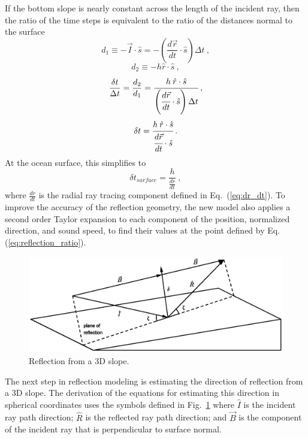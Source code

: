 \documentclass{ws-jca}
\newcommand{\threeD}{3\nobreakdash\textendash D }	%
\begin{document}
If the bottom slope is nearly constant across the length of the incident
ray, then the ratio of the time steps is equivalent to the ratio of the
distances normal to the surface
\begin{equation}
	d_1 \equiv - \vec{I} \cdot \hat{s} 
		= - \left( \frac{d\vec{r}}{dt} \cdot \hat{s} \right) \Delta t \:,
	\label{eq:reflection_d1}
\end{equation}
\begin{equation}
	d_2 \equiv - h \hat{r} \cdot \hat{s} \:,
	\label{eq:reflection_d2}
\end{equation}
\begin{equation}
	\frac{\delta t}{\Delta t} = \frac{d_2}{d_1} 
		= \cfrac{h \: \hat{r} \cdot \hat{s}}{\left( \cfrac{d\vec{r}}{dt} 
		\cdot \hat{s} \right) \Delta t} \:,
	\label{eq:reflection_ratio}
\end{equation}
\begin{equation}
	\delta t = \cfrac{h \: \hat{r} \cdot \hat{s}}{\cfrac{d\vec{r}}{dt} \cdot \hat{s}} \:.
	\label{eq:reflection_time_bottom}
\end{equation}
At the ocean surface, this simplifies to
\begin{equation}
	\delta t_{surface} = \frac{h}{\frac{dr}{dt}} \:,
	\label{eq:reflection_time_surface}
\end{equation}
where \(\frac{dr}{dt}\) is the radial ray tracing component defined in
Eq.~(\ref{eq:dr_dt}).
To improve the accuracy of the reflection geometry, the new model also
applies a second order Taylor expansion to each component of the position,
normalized direction, and sound speed, to find their values at the point
defined by Eq. (\ref{eq:reflection_ratio}).

\begin{figure}[th]
	\centerline{\includegraphics[width=5in]{EstDirectionCollision.eps}} 
	\vspace*{8pt}
	\caption{Reflection from a \threeD slope.}
	\label{fig:reflect3d}
\end{figure}
The next step in reflection modeling is estimating the direction of
reflection from a \threeD slope. The derivation of the equations for
estimating this direction in spherical coordinates uses the
symbols defined in Fig.~\ref{fig:reflect3d} 
where
\(\hat{I}\) is the incident ray path direction;
\(\hat{R}\) is the reflected ray path direction; and
\(\vec{B}\) is the component of the incident ray that is perpendicular to surface normal.
\end{document}
